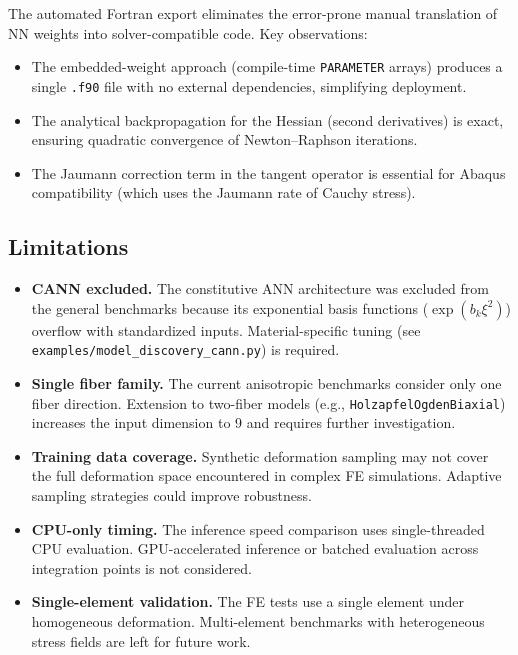 The automated Fortran export eliminates the error-prone manual translation of
NN weights into solver-compatible code.  Key observations:
\begin{itemize}
  \item The embedded-weight approach (compile-time \texttt{PARAMETER} arrays)
    produces a single \texttt{.f90} file with no external dependencies,
    simplifying deployment.
  \item The analytical backpropagation for the Hessian (second derivatives) is
    exact, ensuring quadratic convergence of Newton--Raphson iterations.
  \item The Jaumann correction term in the tangent operator is essential for
    Abaqus compatibility (which uses the Jaumann rate of Cauchy stress).
\end{itemize}


\subsection{Limitations}
\label{sec:discussion:limitations}

\begin{itemize}
  \item \textbf{CANN excluded.}  The constitutive ANN architecture was
    excluded from the general benchmarks because its exponential basis
    functions ($\exp(b_k \xi^2)$) overflow with standardized inputs.
    Material-specific tuning (see \texttt{examples/model\_discovery\_cann.py})
    is required.
  \item \textbf{Single fiber family.}  The current anisotropic benchmarks
    consider only one fiber direction.  Extension to two-fiber models (e.g.,
    \texttt{HolzapfelOgdenBiaxial}) increases the input dimension to 9 and
    requires further investigation.
  \item \textbf{Training data coverage.}  Synthetic deformation sampling may
    not cover the full deformation space encountered in complex FE
    simulations.  Adaptive sampling strategies could improve robustness.
  \item \textbf{CPU-only timing.}  The inference speed comparison uses
    single-threaded CPU evaluation.  GPU-accelerated inference or batched
    evaluation across integration points is not considered.
  \item \textbf{Single-element validation.}  The FE tests use a single
    element under homogeneous deformation.  Multi-element benchmarks with
    heterogeneous stress fields are left for future work.
\end{itemize}
